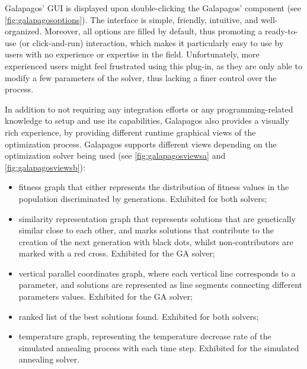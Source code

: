 	Galapagos' \ac{GUI} is displayed upon double-clicking the Galapagos' component (see \cref{fig:galapagosoptions}). The interface is simple, friendly, intuitive, and well-organized. Moreover, all options are filled by default, thus promoting a ready-to-use (or click-and-run) interaction, which makes it particularly easy to use by users with no experience or expertise in the field. Unfortunately, more experienced users might feel frustrated using this plug-in, as they are only able to modify a few parameters of the solver, thus lacking a finer control over the process. 
	
	In addition to not requiring any integration efforts or any programming-related knowledge to setup and use its capabilities, Galapagos also provides a visually rich experience, by providing different runtime graphical views of the optimization process. Galapagos supports different views depending on the optimization solver being used (see \cref{fig:galapagosviewsa} and \cref{fig:galapagosviewsb}):
	\begin{itemize}
		\item fitness graph that either represents the distribution of fitness values in the population discriminated by generations. Exhibited for both solvers;
		\item similarity representation graph that represents solutions that are genetically similar close to each other, and marks solutions that contribute to the creation of the next generation with black dots, whilst non-contributors are marked with a red cross. Exhibited for the \ac{GA} solver;
		\item vertical parallel coordinates graph, where each vertical line corresponds to a parameter, and solutions are represented as line segments connecting different parameters values. Exhibited for the \ac{GA} solver;
		\item ranked list of the best solutions found. Exhibited for both solvers;
		\item temperature graph, representing the temperature decrease rate of the simulated annealing process with each time step. Exhibited for the simulated annealing solver.
	\end{itemize}
	
